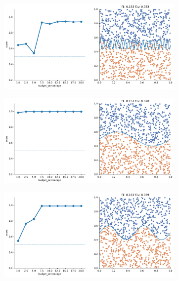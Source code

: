 \begin{figure}
    \begin{subfigure}{.5\textwidth}
        \centering
        \includegraphics[width=\textwidth]{img/2d_v2/9.pdf}
    \end{subfigure}%
    \begin{subfigure}{.5\textwidth}
        \centering
        \includegraphics[width=\textwidth]{img/2d_v2/10.pdf}
    \end{subfigure}
    \hfill
    \begin{subfigure}{.5\textwidth}
        \centering
        \includegraphics[width=\textwidth]{img/2d_v2/11.pdf}

\end{subfigure}
\end{figure}
